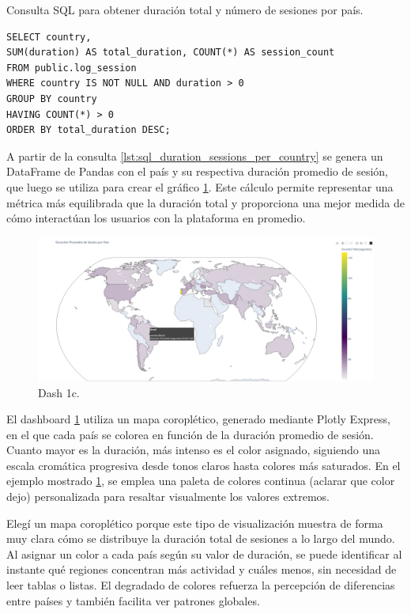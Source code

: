 \documentclass[a4paper, 12pt]{book}
\begin{document}
\begin{listing}[h!]
    \caption{Consulta SQL para obtener duración total y número de sesiones por país.}{}
    \label{lst:sql_duration_sessions_per_country}
    \begin{verbatim}
SELECT country, 
SUM(duration) AS total_duration, COUNT(*) AS session_count 
FROM public.log_session
WHERE country IS NOT NULL AND duration > 0
GROUP BY country
HAVING COUNT(*) > 0  
ORDER BY total_duration DESC;
    \end{verbatim}
\end{listing}


A partir de la consulta \ref{lst:sql_duration_sessions_per_country} se genera un DataFrame de Pandas con el país y su respectiva duración promedio de sesión, que luego se utiliza para crear el gráfico \ref{fig:1c}. Este cálculo permite representar una métrica más equilibrada que la duración total y proporciona una mejor medida de cómo interactúan los usuarios con la plataforma en promedio.

\begin{figure}
  \centering
  \includegraphics[width=1.1\textwidth]{img/1c.png}
  \caption{Dash 1c.}\label{fig:1c}
\end{figure}

El dashboard \ref{fig:1c} utiliza un mapa coroplético, generado mediante Plotly Express, en el que cada país se colorea en función de la duración promedio de sesión. Cuanto mayor es la duración, más intenso es el color asignado, siguiendo una escala cromática progresiva desde tonos claros hasta colores más saturados. En el ejemplo mostrado \ref{fig:1c}, se emplea una paleta de colores continua (aclarar que color dejo) personalizada para resaltar visualmente los valores extremos.

Elegí un mapa coroplético porque este tipo de visualización muestra de forma muy clara cómo se distribuye la duración total de sesiones a lo largo del mundo. Al asignar un color a cada país según su valor de duración, se puede identificar al instante qué regiones concentran más actividad y cuáles menos, sin necesidad de leer tablas o listas. El degradado de colores refuerza la percepción de diferencias entre países y también facilita ver patrones globales.
\end{document}
